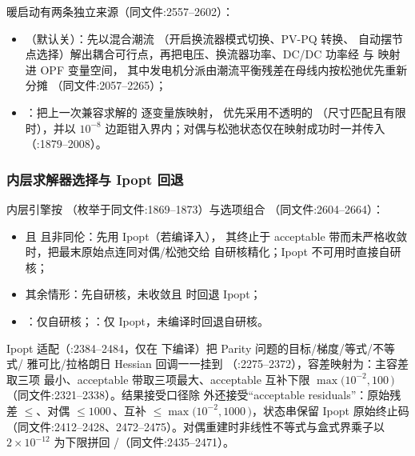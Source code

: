 暖启动有两条独立来源（同文件:2557--2602）：
\begin{itemize}
  \item {}（默认关）：先以混合潮流
        （开启换流器模式切换、PV-PQ 转换、
        自动摆节点选择）解出耦合可行点，再把电压、换流器功率、DC/DC 功率经
         与
         映射进 OPF 变量空间，
        其中发电机分派由潮流平衡残差在母线内按松弛优先重新分摊
        （同文件:2057--2265）；
  \item {}：把上一次兼容求解的  逐变量族映射，
        优先采用不透明的 （尺寸匹配且有限时），并以
        $10^{-8}$ 边距钳入界内；对偶与松弛状态仅在映射成功时一并传入
        （:1879--2008）。
\end{itemize}

\subsubsection*{内层求解器选择与 Ipopt 回退}
内层引擎按 （枚举于同文件:1869--1873）与选项组合
（同文件:2604--2664）：
\begin{itemize}
  \item {} 且  且非同伦：先用 Ipopt（若编译入），
        其终止于 acceptable 带而未严格收敛时，把最末原始点连同对偶/松弛交给
        自研核精化；Ipopt 不可用时直接自研核；
  \item {} 其余情形：先自研核，未收敛且  时回退 Ipopt；
  \item {}：仅自研核；：仅 Ipopt，未编译时回退自研核。
\end{itemize}
Ipopt 适配（:2384--2484，仅在
 下编译）把 Parity 问题的目标/梯度/等式/不等式/
雅可比/拉格朗日 Hessian 回调一一挂到 
（:2275--2372），容差映射为：主容差取三项
最小、acceptable 带取三项最大、acceptable 互补下限 $\max(10^{-2},100\,
$$)$（同文件:2321--2338）。结果接受口径除
 外还接受``acceptable residuals''：原始残差
$\le$、对偶 $\le1000\,$、互补
$\le\max(10^{-2},1000\,$$)$，状态串保留 Ipopt 原始终止码
（同文件:2412--2428、2472--2475）。对偶重建时非线性不等式与盒式界乘子以
$2\times10^{-12}$ 为下限拼回 /（同文件:2435--2471）。

